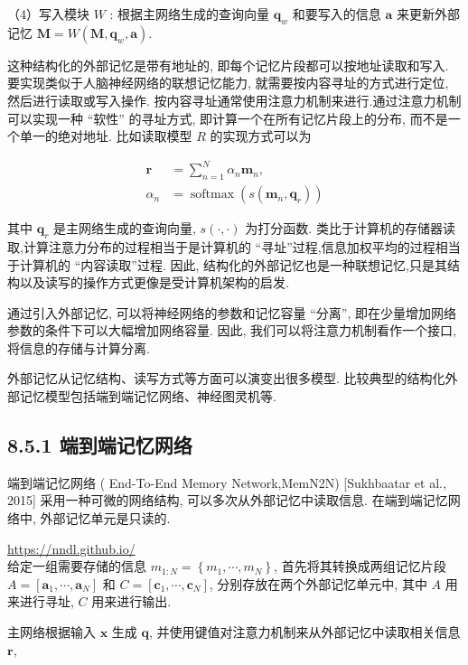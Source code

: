 \documentclass[10pt]{article}
\begin{document}
（4）写入模块 $W$ : 根据主网络生成的查询向量 $\boldsymbol{q}_{w}$ 和要写入的信息 $\boldsymbol{a}$ 来更新外部记忆 $\boldsymbol{M}=W\left(\boldsymbol{M}, \boldsymbol{q}_{w}, \boldsymbol{a}\right)$.

这种结构化的外部记忆是带有地址的, 即每个记忆片段都可以按地址读取和写入. 要实现类似于人脑神经网络的联想记忆能力, 就需要按内容寻址的方式进行定位, 然后进行读取或写入操作. 按内容寻址通常使用注意力机制来进行.通过注意力机制可以实现一种 “软性” 的寻址方式, 即计算一个在所有记忆片段上的分布, 而不是一个单一的绝对地址. 比如读取模型 $R$ 的实现方式可以为


\begin{align*}
\boldsymbol{r} & =\sum_{n=1}^{N} \alpha_{n} \boldsymbol{m}_{n},  \tag{8.23}\\
\alpha_{n} & =\operatorname{softmax}\left(s\left(\boldsymbol{m}_{n}, \boldsymbol{q}_{r}\right)\right) \tag{8.24}
\end{align*}


其中 $\boldsymbol{q}_{r}$ 是主网络生成的查询向量, $s(\cdot, \cdot)$ 为打分函数. 类比于计算机的存储器读取,计算注意力分布的过程相当于是计算机的 “寻址”过程,信息加权平均的过程相当于计算机的 “内容读取”过程. 因此, 结构化的外部记忆也是一种联想记忆,只是其结构以及读写的操作方式更像是受计算机架构的启发.

通过引入外部记忆, 可以将神经网络的参数和记忆容量 “分离”, 即在少量增加网络参数的条件下可以大幅增加网络容量. 因此, 我们可以将注意力机制看作一个接口, 将信息的存储与计算分离.

外部记忆从记忆结构、读写方式等方面可以演变出很多模型. 比较典型的结构化外部记忆模型包括端到端记忆网络、神经图灵机等.

\subsection*{8.5.1 端到端记忆网络}
端到端记忆网络 ( End-To-End Memory Network,MemN2N) [Sukhbaatar et al., 2015] 采用一种可微的网络结构, 可以多次从外部记忆中读取信息. 在端到端记忆网络中, 外部记忆单元是只读的.

\href{https://nndl.github.io/}{https://nndl.github.io/}\\
给定一组需要存储的信息 $m_{1: N}=\left\{m_{1}, \cdots, m_{N}\right\}$, 首先将其转换成两组记忆片段 $A=\left[\boldsymbol{a}_{1}, \cdots, \boldsymbol{a}_{N}\right]$ 和 $C=\left[\boldsymbol{c}_{1}, \cdots, \boldsymbol{c}_{N}\right]$, 分别存放在两个外部记忆单元中, 其中 $A$ 用来进行寻址, $C$ 用来进行输出.

主网络根据输入 $\boldsymbol{x}$ 生成 $\boldsymbol{q}$, 并使用键值对注意力机制来从外部记忆中读取相关信息 $\boldsymbol{r}$,
\end{document}
